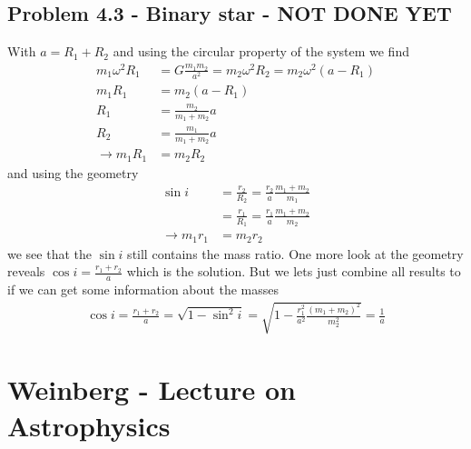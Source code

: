 \documentclass[10pt,a4paper]{book}
\theoremstyle{definition}
\begin{document}
\subsection{Problem 4.3 - Binary star - NOT DONE YET}
With $a=R_1+R_2$ and using the circular property of the system we find
\begin{align}
m_1\omega^2R_1&=G\frac{m_1m_2}{a^2}=m_2\omega^2R_2=m_2\omega^2(a-R_1)\\
m_1R_1&=m_2(a-R_1)\\
R_1&=\frac{m_2}{m_1+m_2}a\\
R_2&=\frac{m_1}{m_1+m_2}a\\
\rightarrow m_1R_1&=m_2R_2
\end{align}
and using the geometry
\begin{align}
\sin i
&=\frac{r_2}{R_2}=\frac{r_2}{a}\frac{m_1+m_2}{m_1}\\
&=\frac{r_1}{R_1}=\frac{r_1}{a}\frac{m_1+m_2}{m_2}\\
\rightarrow m_1r_1&=m_2r_2
\end{align}
we see that the $\sin i$ still contains the mass ratio. One more look at the geometry reveals $\cos i=\frac{r_1+r_2}{a}$ which is the solution. But we lets just combine all results to if we can get some information about the masses 
\begin{align}
\cos i=\frac{r_1+r_2}{a}
=\sqrt{1-\sin^2 i}=\sqrt{1-\frac{r_1^2}{a^2}\frac{(m_1+m_2)^2}{m_2^2}}=\frac{1}{a}
\end{align}


\section{{\sc Weinberg} - Lecture on Astrophysics}
\end{document}
